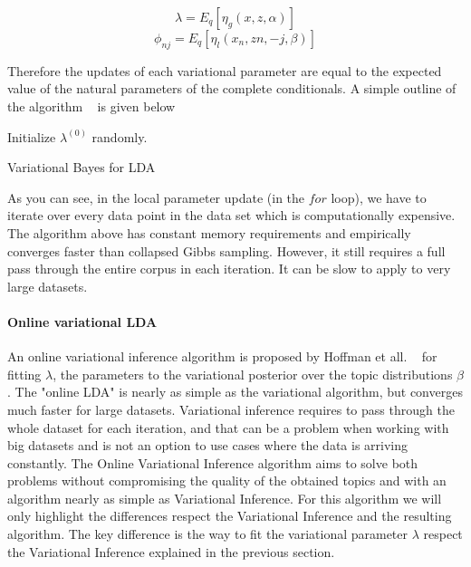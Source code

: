 \documentclass[12pt]{report}
\begin{document}
\begin{equation}
\lambda = E_q[\eta_g(x, z, \alpha)]
\end{equation}
\begin{equation}
\phi_{nj} = E_q[\eta_l(x_n, z{n, -j}, \beta)]
\end{equation}

Therefore the updates of each variational parameter are equal to the expected
value of the natural parameters of the complete conditionals. A simple outline 
of the algorithm ~\cite{alexminnar} is given below


\begin{algorithm}[H] 
\SetAlgoLined

Initialize $\lambda^{(0)}$ randomly.
\caption{Variational Bayes for LDA} 
\end{algorithm}


As you can see, in the local parameter update (in the $for$ loop), we have to
iterate over every data point in the data set which is computationally
expensive. The algorithm above has constant memory requirements and empirically
converges faster than collapsed Gibbs sampling. However, it still requires a
full pass through the entire corpus in each iteration. It can be slow to apply
to very large datasets.

\paragraph{Online variational LDA}


An online variational inference algorithm is proposed by Hoffman et all.
~\cite{onlineLDAvb} for fitting $\lambda$, the parameters to the variational
posterior over the topic distributions $\beta$. The "online LDA" is nearly as
simple as the variational algorithm, but converges much faster for large
datasets. Variational inference requires to pass through the whole dataset for
each iteration, and that can be a problem when working with big datasets and is
not an option to use cases where the data is arriving constantly. The Online
Variational Inference algorithm aims to solve both problems without compromising
the quality of the obtained topics and with an algorithm nearly as simple as
Variational Inference. For this algorithm we will only highlight the differences
respect the Variational Inference and the resulting algorithm. The key
difference is the way to fit the variational parameter $\lambda$ respect the
Variational Inference explained in the previous section.
\end{document}
